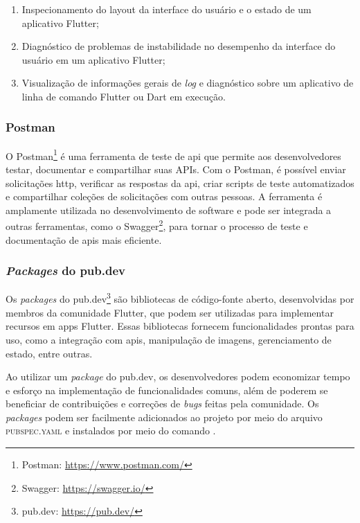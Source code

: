  \begin{enumerate}
   \item Inspecionamento do layout da interface do usuário e o estado de um aplicativo Flutter;
   \item Diagnóstico de problemas de instabilidade no desempenho da interface do usuário em um aplicativo Flutter;
   \item Visualização de informações gerais de \textit{log} e diagnóstico sobre um aplicativo de linha de comando Flutter ou Dart em execução.
 \end{enumerate}

\subsubsection{Postman}\label{sssec:postman}
O Postman\footnote{\label{postman}Postman: \url{https://www.postman.com/}} é uma ferramenta de teste de \ac{api} que permite aos desenvolvedores testar, documentar e compartilhar suas APIs. Com o Postman, é possível enviar solicitações \ac{http}, verificar as respostas da \ac{api}, criar scripts de teste automatizados e compartilhar coleções de solicitações com outras pessoas. A ferramenta é amplamente utilizada no desenvolvimento de software e pode ser integrada a outras ferramentas, como o Swagger\footnote{\label{swagger}Swagger: \url{https://swagger.io/}}, para tornar o processo de teste e documentação de \acp{api} mais eficiente.

\subsubsection{\textit{Packages} do pub.dev}\label{sssec:pubdev}
Os \textit{packages} do pub.dev\footnote{\label{pubdev}pub.dev: \url{https://pub.dev/}} são bibliotecas de código-fonte aberto, desenvolvidas por membros da comunidade Flutter, que podem ser utilizadas para implementar recursos em \acp{app} Flutter. Essas bibliotecas fornecem funcionalidades prontas para uso, como a integração com \acp{api}, manipulação de imagens, gerenciamento de estado, entre outras. 

Ao utilizar um \textit{package} do pub.dev, os desenvolvedores podem economizar tempo e esforço na implementação de funcionalidades comuns, além de poderem se beneficiar de contribuições e correções de \textit{bugs} feitas pela comunidade. Os \textit{packages} podem ser facilmente adicionados ao projeto por meio do arquivo \textsc{pubspec.yaml} e instalados por meio do comando .

